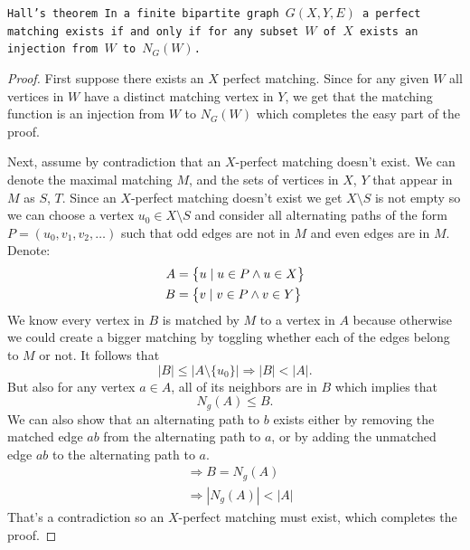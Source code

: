 \documentclass[11pt,a4paper]{article}
\begin{document}
	\begin{theorem}\tt{Hall's theorem}
    In a finite bipartite graph $G(X,Y,E)$ 
    a perfect matching exists if and only if for any subset $W$ of $X$ 
    exists an injection from $W$ to $N_G(W)$.
	\end{theorem}
  \begin{proof}
	First suppose there exists an $X$ perfect matching.
  Since for any given $W$ all vertices in $W$ have a distinct matching 
  vertex in $Y$,
	we get that the matching function is an injection from $W$ to $N_G(W)$
  which completes the easy part of the proof.
	
	Next, assume by contradiction that an $X$-perfect matching doesn't exist.
  We can denote the maximal matching $M$, and the sets of vertices 
	in $X$, $Y$ that appear in $M$ as $S$, $T$.
	Since an $X$-perfect matching doesn't exist we get $X \setminus S$ is
  not empty
	so we can choose a vertex $u_0 \in X \setminus S$ and consider all 
	alternating paths of the form $P=(u_0,v_1,v_2,\ldots)$ such that 
	odd edges are not in $M$ and even edges are in $M$.
	Denote:
	\begin{align*}
		A &= \left\{u \mid u \in P \land u \in X\right\} \\
		B &= \left\{v \mid v \in P \land v \in Y\right\}
	\end{align*}
	We know every vertex in $B$ is matched by $M$ to a vertex in $A$ 
	because otherwise we could create a bigger matching by toggling 
	whether each of the edges belong to $M$ or not.
  It follows that
	\[
		|B| \le |A \setminus \{u_0\}| \Rightarrow |B| < |A|.
	\]
	But also for any vertex $a \in A$, all of its neighbors are in $B$ which
	implies that
	\[
		N_g(A) \le B.
	\]
	We can also show that an alternating path to $b$ exists either by removing 
	the matched edge $ab$ from the alternating path to $a$, or by adding 
	the unmatched edge $ab$ to the alternating path to $a$.
	\begin{align*}
		&\Rightarrow B = N_g(A) \\ 
		&\Rightarrow |N_g(A)|<|A|
	\end{align*}
	That's a contradiction so an $X$-perfect matching must exist, which completes
  the proof.
  \end{proof}

	\newpage
\end{document}
